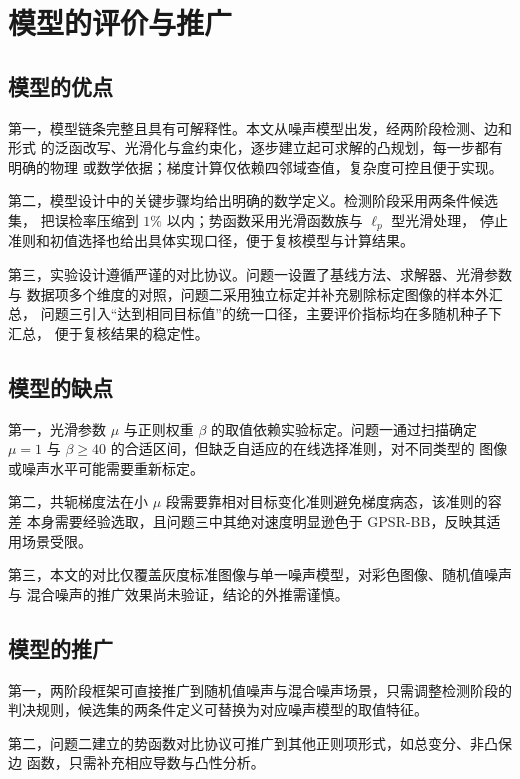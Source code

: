 \documentclass[withoutpreface,bwprint]{cumcmthesis}
\begin{document}
\section{模型的评价与推广}

\subsection{模型的优点}

第一，模型链条完整且具有可解释性。本文从噪声模型出发，经两阶段检测、边和形式
的泛函改写、光滑化与盒约束化，逐步建立起可求解的凸规划，每一步都有明确的物理
或数学依据；梯度计算仅依赖四邻域查值，复杂度可控且便于实现。

第二，模型设计中的关键步骤均给出明确的数学定义。检测阶段采用两条件候选集，
把误检率压缩到 $1\%$ 以内；势函数采用光滑函数族与 $\ell_p$ 型光滑处理，
停止准则和初值选择也给出具体实现口径，便于复核模型与计算结果。

第三，实验设计遵循严谨的对比协议。问题一设置了基线方法、求解器、光滑参数与
数据项多个维度的对照，问题二采用独立标定并补充剔除标定图像的样本外汇总，
问题三引入``达到相同目标值''的统一口径，主要评价指标均在多随机种子下汇总，
便于复核结果的稳定性。

\subsection{模型的缺点}

第一，光滑参数 $\mu$ 与正则权重 $\beta$ 的取值依赖实验标定。问题一通过扫描确定
$\mu=1$ 与 $\beta\ge40$ 的合适区间，但缺乏自适应的在线选择准则，对不同类型的
图像或噪声水平可能需要重新标定。

第二，共轭梯度法在小 $\mu$ 段需要靠相对目标变化准则避免梯度病态，该准则的容差
本身需要经验选取，且问题三中其绝对速度明显逊色于 GPSR-BB，反映其适用场景受限。

第三，本文的对比仅覆盖灰度标准图像与单一噪声模型，对彩色图像、随机值噪声与
混合噪声的推广效果尚未验证，结论的外推需谨慎。

\subsection{模型的推广}

第一，两阶段框架可直接推广到随机值噪声与混合噪声场景，只需调整检测阶段的
判决规则，候选集的两条件定义可替换为对应噪声模型的取值特征。

第二，问题二建立的势函数对比协议可推广到其他正则项形式，如总变分、非凸保边
函数，只需补充相应导数与凸性分析。
\end{document}
